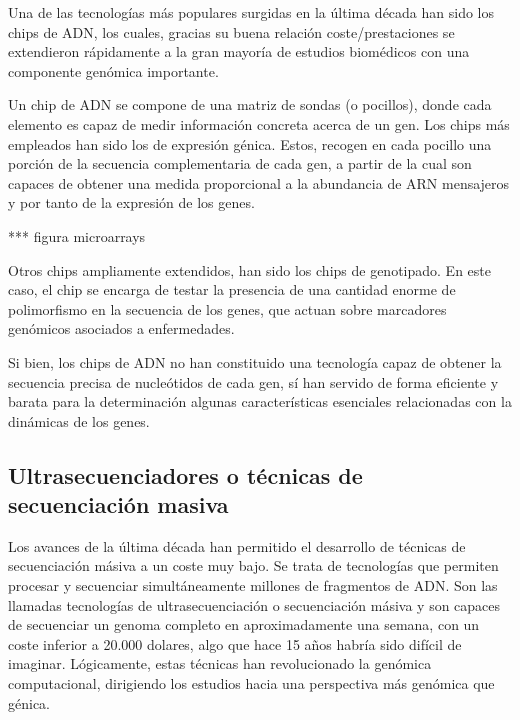 \medskip
Una de las tecnologías más populares surgidas en la última década han sido los chips de ADN, los cuales, gracias su buena relación coste/prestaciones se extendieron rápidamente a la gran mayoría de estudios biomédicos con una componente genómica importante.

\medskip
Un chip de ADN se compone de una matriz de sondas (o pocillos), donde cada elemento es capaz de medir información concreta acerca de un gen. Los chips más empleados han sido los de expresión génica. Estos, recogen en cada pocillo una porción de la secuencia complementaria de cada gen, a partir de la cual son capaces de obtener una medida proporcional a la abundancia de ARN mensajeros y por tanto de la expresión de los genes. 

*** figura microarrays

\medskip
Otros chips ampliamente extendidos, han sido los chips de genotipado. En este caso, el chip se encarga de testar la presencia de una cantidad enorme de polimorfismo en la secuencia de los genes, que actuan sobre marcadores genómicos asociados a enfermedades.

\medskip
Si bien, los chips de ADN no han constituido una tecnología capaz de obtener la secuencia precisa de nucleótidos de cada gen, sí han servido de forma eficiente y barata para la determinación algunas características esenciales relacionadas con la dinámicas de los genes.

\subsection{Ultrasecuenciadores o técnicas de secuenciación masiva}

Los avances de la última década han permitido el desarrollo de técnicas de secuenciación másiva a un coste muy bajo. Se trata de tecnologías que permiten procesar y secuenciar simultáneamente millones de fragmentos de ADN. Son las llamadas tecnologías de ultrasecuenciación o secuenciación másiva y son capaces de secuenciar un genoma completo en aproximadamente una semana, con un coste inferior a 20.000 dolares, algo que hace 15 años habría sido difícil de imaginar. Lógicamente, estas técnicas han revolucionado la genómica computacional, dirigiendo los estudios hacia una perspectiva más genómica que génica.

